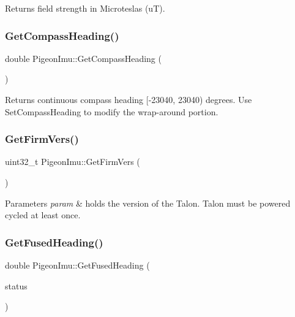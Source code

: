 \begin{DoxyReturn}{Returns}
field strength in Microteslas (uT). 
\end{DoxyReturn}
\mbox{\label{class_pigeon_imu_ae867b4c973dd80f987da8b99c2d22a34}} 
\subsubsection{\texorpdfstring{Get\+Compass\+Heading()}{GetCompassHeading()}}
{\footnotesize\ttfamily double Pigeon\+Imu\+::\+Get\+Compass\+Heading (\begin{DoxyParamCaption}{ }\end{DoxyParamCaption})}

\begin{DoxyReturn}{Returns}
continuous compass heading \mbox{[}-\/23040, 23040) degrees. Use Set\+Compass\+Heading to modify the wrap-\/around portion. 
\end{DoxyReturn}
\mbox{\label{class_pigeon_imu_ad5954805f7a9cc1f6fe2465b9da9a0e4}} 
\subsubsection{\texorpdfstring{Get\+Firm\+Vers()}{GetFirmVers()}}
{\footnotesize\ttfamily uint32\+\_\+t Pigeon\+Imu\+::\+Get\+Firm\+Vers (\begin{DoxyParamCaption}{ }\end{DoxyParamCaption})}


\begin{DoxyParams}{Parameters}
{\em param} & holds the version of the Talon. Talon must be powered cycled at least once. \\
\hline
\end{DoxyParams}
\mbox{\label{class_pigeon_imu_a4d1264230776fa2be5e9a63f1ae0a41d}} 
\subsubsection{\texorpdfstring{Get\+Fused\+Heading()}{GetFusedHeading()}\hspace{0.1cm}{\footnotesize\ttfamily [1/2]}}
{\footnotesize\ttfamily double Pigeon\+Imu\+::\+Get\+Fused\+Heading (\begin{DoxyParamCaption}\item[{\hyperlink{struct_pigeon_imu_1_1_fusion_status}{Fusion\+Status} \&}]{status }\end{DoxyParamCaption})}


